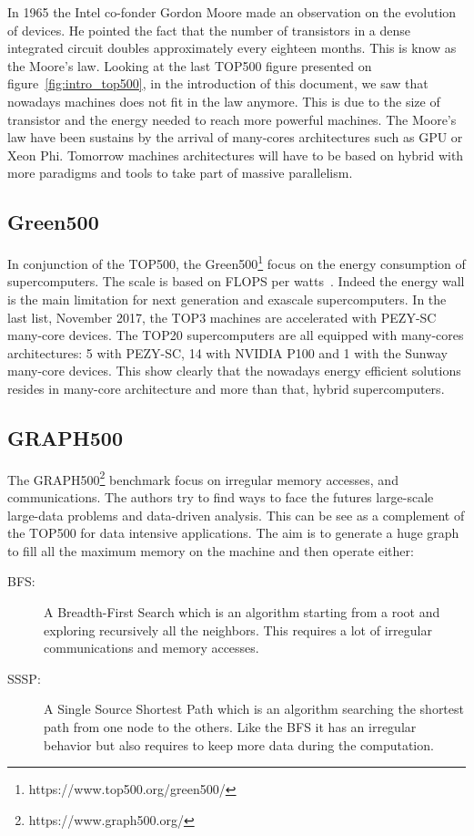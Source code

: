 In 1965 the Intel co-fonder Gordon Moore made an observation\cite{present2000cramming} on the evolution of devices. 
He pointed the fact that the number of transistors in a dense integrated circuit doubles approximately every eighteen months.
This is know as the Moore's law. 
Looking at the last TOP500 figure presented on figure~\ref{fig:intro_top500}, in the introduction of this document, we saw that nowadays machines does not fit in the law anymore. 
This is due to the size of transistor and the energy needed to reach more powerful machines. 
The Moore's law have been sustains by the arrival of many-cores architectures such as GPU or Xeon Phi. 
Tomorrow machines architectures will have to be based on hybrid with more paradigms and tools to take part of massive parallelism.


\subsection{Green500}
In conjunction of the TOP500, the Green500\footnote{https://www.top500.org/green500/} focus on the energy consumption of supercomputers. 
The scale is based on FLOPS per watts~\cite{feng2007green500}.
Indeed the energy wall is the main limitation for next generation and exascale supercomputers. 
In the last list, November 2017, the TOP3 machines are accelerated with PEZY-SC many-core devices. 
The TOP20 supercomputers are all equipped with many-cores architectures: 5 with PEZY-SC, 14 with NVIDIA P100 and 1 with the Sunway many-core devices. 
This show clearly that the nowadays energy efficient solutions resides in many-core architecture and more than that, hybrid supercomputers. 

\subsection{GRAPH500}
The GRAPH500\footnote{https://www.graph500.org/} benchmark\cite{murphy2010introducing} focus on irregular memory accesses, and communications.
The authors try to find ways to face the futures large-scale large-data problems and data-driven analysis.
This can be see as a complement of the TOP500 for data intensive applications.
The aim is to generate a huge graph to fill all the maximum memory on the machine and then operate either:
\begin{description}
  \item[BFS:] A Breadth-First Search which is an algorithm starting from a root and exploring recursively all the neighbors. 
  This requires a lot of irregular communications and memory accesses. 
  \item[SSSP:] A Single Source Shortest Path which is an algorithm searching the shortest path from one node to the others. 
  Like the BFS it has an irregular behavior but also requires to keep more data during the computation.
\end{description}

